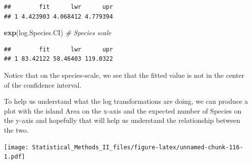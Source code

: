 \documentclass[]{book}
\newenvironment{Shaded}{\begin{snugshade}}{\end{snugshade}}
\newcommand{\KeywordTok}[1]{\textcolor[rgb]{0.13,0.29,0.53}{\textbf{{#1}}}}
\newcommand{\DataTypeTok}[1]{\textcolor[rgb]{0.13,0.29,0.53}{{#1}}}
\newcommand{\DecValTok}[1]{\textcolor[rgb]{0.00,0.00,0.81}{{#1}}}
\newcommand{\StringTok}[1]{\textcolor[rgb]{0.31,0.60,0.02}{{#1}}}
\newcommand{\CommentTok}[1]{\textcolor[rgb]{0.56,0.35,0.01}{\textit{{#1}}}}
\newcommand{\NormalTok}[1]{{#1}}
\theoremstyle{definition}
\theoremstyle{definition}
\theoremstyle{remark}
\begin{document}
\begin{verbatim}
##        fit      lwr      upr
## 1 4.423903 4.068412 4.779394
\end{verbatim}

\begin{Shaded}
\begin{Highlighting}[]
\KeywordTok{exp}\NormalTok{(log.Species.CI)  }\CommentTok{# Species scale}
\end{Highlighting}
\end{Shaded}

\begin{verbatim}
##        fit      lwr      upr
## 1 83.42122 58.46403 119.0322
\end{verbatim}

Notice that on the species-scale, we see that the fitted value is not in
the center of the confidence interval.

To help us understand what the log transformations are doing, we can
produce a plot with the island Area on the x-axis and the expected
number of Species on the y-axis and hopefully that will help us
understand the relationship between the two.

\begin{Shaded}
\end{Shaded}

\texttt{[image: Statistical\_Methods\_II\_files/figure-latex/unnamed-chunk-116-1.pdf]}
\end{document}
